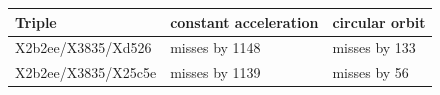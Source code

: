 \begin{tabular}{@{}l@{~}l@{~}l@{}}
\hline
Triple & constant acceleration & circular orbit \\
\hline
X2b2ee/X3835/Xd526 & misses by 1148 & misses by 133 \\
X2b2ee/X3835/X25c5e & misses by 1139 & misses by 56 \\
\hline
\end{tabular}
